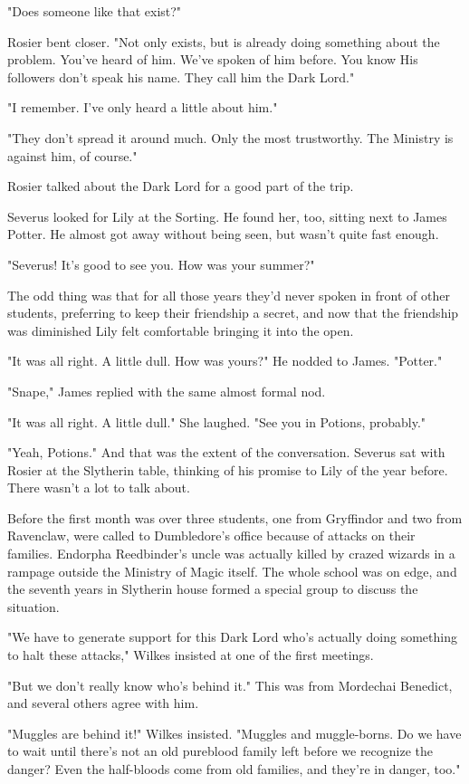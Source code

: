 "Does someone like that exist?"

Rosier bent closer. "Not only exists, but is already doing something about the problem. You've heard of him. We've spoken of him before. You know{\el} His followers don't speak his name. They call him the Dark Lord."

"I remember. I've only heard a little about him."

"They don't spread it around much. Only the most trustworthy. The Ministry is against him, of course."

Rosier talked about the Dark Lord for a good part of the trip.

Severus looked for Lily at the Sorting. He found her, too, sitting next to James Potter. He almost got away without being seen, but wasn't quite fast enough.

"Severus! It's good to see you. How was your summer?"

The odd thing was that for all those years they'd never spoken in front of other students, preferring to keep their friendship a secret, and now that the friendship was diminished Lily felt comfortable bringing it into the open.

"It was all right. A little dull. How was yours?" He nodded to James. "Potter."

"Snape," James replied with the same almost formal nod.

"It was all right. A little dull." She laughed. "See you in Potions, probably."

"Yeah, Potions." And that was the extent of the conversation. Severus sat with Rosier at the Slytherin table, thinking of his promise to Lily of the year before. There wasn't a lot to talk about.

Before the first month was over three students, one from Gryffindor and two from Ravenclaw, were called to Dumbledore's office because of attacks on their families. Endorpha Reedbinder's uncle was actually killed by crazed wizards in a rampage outside the Ministry of Magic itself. The whole school was on edge, and the seventh years in Slytherin house formed a special group to discuss the situation.

"We have to generate support for this Dark Lord who's actually doing something to halt these attacks," Wilkes insisted at one of the first meetings.

"But we don't really know who's behind it." This was from Mordechai Benedict, and several others agree with him.

"Muggles are behind it!" Wilkes insisted. "Muggles and muggle-borns. Do we have to wait until there's not an old pureblood family left before we recognize the danger? Even the half-bloods come from old families, and they're in danger, too."

